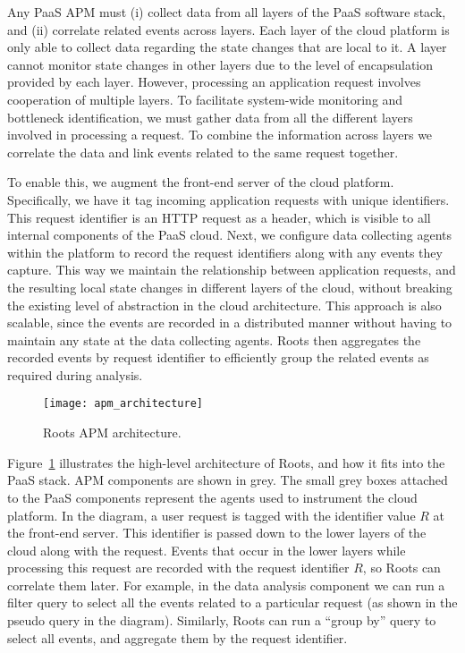 Any PaaS APM must (i) collect data from all layers of the PaaS software stack, and
(ii) correlate related events across layers.
Each layer of the cloud platform is only able to collect data regarding the
state changes that are local to it. A layer cannot monitor state changes
in other layers due to the level of encapsulation provided by each layer. However,
processing an application request involves cooperation of multiple layers. 
To facilitate system-wide monitoring and
bottleneck identification, we must gather data from all the different layers involved
in processing a request. To combine the information across layers
we correlate the data and link events related to the same request together.

To enable this, we augment the front-end server of the cloud platform. 
Specifically, we have it tag incoming application requests with unique identifiers.
This request identifier is an HTTP request as a header, which is visible to all 
internal components of the PaaS cloud. Next, we configure data collecting agents 
within the platform to record the request identifiers along with any events they capture. 
This way we maintain the relationship between application requests, and the resulting
local state changes in different layers of the cloud, without breaking the existing level
of abstraction in the cloud architecture. This approach is also scalable, since the events are
recorded in a distributed manner without having to maintain any state at the data collecting agents. 
Roots then aggregates the recorded events by request 
identifier to efficiently group the related events as required during analysis.

\begin{figure}
\centering
\texttt{[image: apm\_architecture]}
\caption{Roots APM architecture.}
\label{fig:apm_architecture}
\end{figure}

Figure~\ref{fig:apm_architecture} illustrates the high-level architecture of Roots, and how 
it fits into the PaaS stack. APM components are shown in grey. 
The small grey boxes attached to the PaaS components represent the
agents used to instrument the cloud platform. 
In the diagram, a user request is tagged with the identifier value
$R$ at the front-end server. This identifier is passed down to the lower layers of the cloud
along with the request. Events that occur in the lower layers while processing this request
are recorded with the request identifier $R$, so Roots can correlate them later. For example, in the 
data analysis component we can run a filter query to select all the events related to a particular
request (as shown in the pseudo query in the diagram). Similarly, Roots can run a ``group by'' 
query to select all events, and aggregate them by the request identifier.

